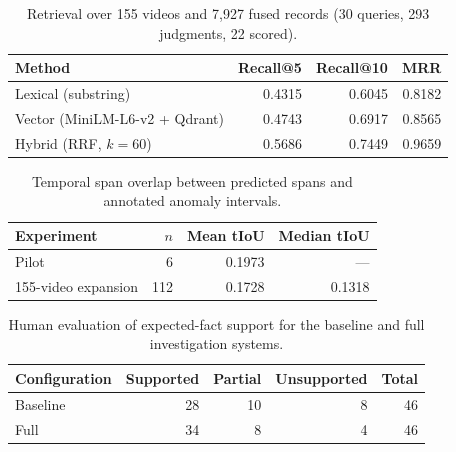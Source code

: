 
\begin{table}[!t]
\centering
\caption{Retrieval over 155 videos and 7,927 fused records (30 queries, 293 judgments, 22 scored).}
\label{tab:retrieval}
\begin{tabular}{lrrr}
\toprule
Method & Recall@5 & Recall@10 & MRR \\
\midrule
Lexical (substring) & 0.4315 & 0.6045 & 0.8182 \\
Vector (MiniLM-L6-v2 + Qdrant) & 0.4743 & 0.6917 & 0.8565 \\
Hybrid (RRF, $k=60$) & 0.5686 & 0.7449 & 0.9659 \\
\bottomrule
\end{tabular}
\end{table}

\begin{table}[!t]
\centering
\caption{Temporal span overlap between predicted spans and annotated anomaly intervals.}
\label{tab:tiou}
\begin{tabular}{lrrr}
\toprule
Experiment & $n$ & Mean tIoU & Median tIoU \\
\midrule
Pilot & 6 & 0.1973 & --- \\
155-video expansion & 112 & 0.1728 & 0.1318 \\
\bottomrule
\end{tabular}
\end{table}

\begin{table}[!t]
\centering
\caption{Human evaluation of expected-fact support for the baseline and full investigation systems.}
\label{tab:fact-support-v2}
\begin{tabular}{lrrrr}
\toprule
Configuration & Supported & Partial & Unsupported & Total \\
\midrule
Baseline & 28 & 10 & 8 & 46 \\
Full & 34 & 8 & 4 & 46 \\
\bottomrule
\end{tabular}
\end{table}

